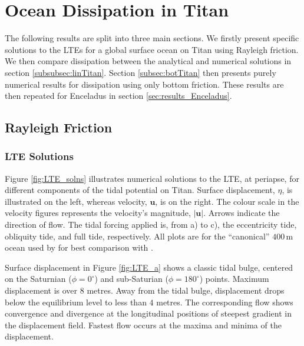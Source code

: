 \section{Ocean Dissipation in Titan \label{sec:results_Titan}}

The following results are split into three main sections. We firstly present specific solutions to the LTEs for a global surface ocean on Titan using Rayleigh friction. We then compare dissipation between the analytical and numerical solutions in section \ref{subsubsec:linTitan}. Section \ref{subsec:botTitan} then presents purely numerical results for dissipation using only bottom friction. These results are then repeated for Enceladus in section \ref{sec:results_Enceladus}.

\subsection{Rayleigh Friction}

\subsubsection{LTE Solutions}

Figure \ref{fig:LTE_solns} illustrates numerical solutions to the LTE, at periapse, for different components of the tidal potential on Titan. Surface displacement, $\eta$, is illustrated on the left, whereas velocity, $\bm{u}$, is on the right. The colour scale in the velocity figures represents the velocity's magnitude, $\left| \bm{u} \right|$. Arrows indicate the direction of flow. The tidal forcing applied is, from a) to c), the eccentricity tide, obliquity tide, and full tide, respectively. All plots are for the ``canonical'' $400 \, \si{\metre}$ ocean used by \citet{sagan1982tide} for best comparison with \citet{sears1994tidal,sears1995tidal,sohl1995tidal}.

Surface displacement in Figure \ref{fig:LTE_a} shows a classic tidal bulge, centered on the Saturnian ($\phi = 0^{\circ}$) and sub-Saturian ($\phi = 180^{\circ}$) points. Maximum displacement is over $8$ metres. Away from the tidal bulge, displacement drops below the equilibrium level to less than $4$ metres. The corresponding flow shows convergence and divergence at the longitudinal positions of steepest gradient in the displacement field. Fastest flow occurs at the maxima and minima of the displacement.

